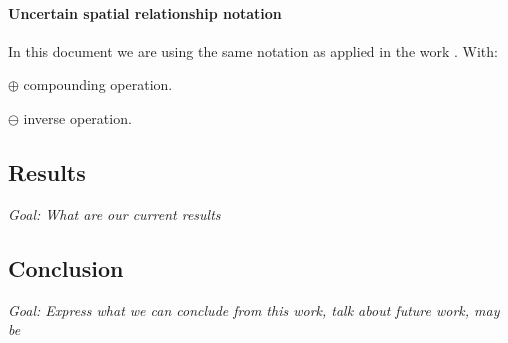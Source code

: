 
\paragraph{Uncertain spatial relationship notation} In this document we are using the same notation as applied in the work \cite{Wang04a}. With:

$\oplus$ compounding operation.

$\ominus$ inverse operation.

\subsection{Results}

\textit{Goal: What are our current results}

\subsection{Conclusion}

\textit{Goal: Express what we can conclude from this work, talk about future work, may be}